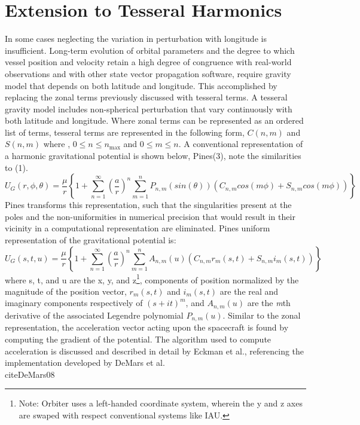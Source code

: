 \documentclass[a4paper]{article}
\begin{document}
\section{Extension to Tesseral Harmonics}
In some cases neglecting the variation in perturbation with longitude is insufficient. Long-term evolution of orbital parameters and the degree to which vessel position and velocity retain a high degree of congruence with real-world observations and with other state vector propagation software, require gravity model that depends on both latitude and longitude.
This accomplished by replacing the zonal terms previously discussed with tesseral terms. A tesseral gravity model includes non-spherical perturbation that vary continuously with both latitude and longitude. Where zonal terms can be represented as an ordered list of terms, tesseral terms are represented in the following form, $C(n,m)$ and $S(n,m)$ where , $0 \leq n \leq n_\text{max}$ and $0 \leq m \leq n$.
A conventional representation of a harmonic gravitational potential is shown below, Pines\cite{pines73}(3), note the similarities to (1).
\begin{equation}
U_G(r,\phi,\theta) = \frac{\mu}{r}\left\{1+\sum_{n=1}^{\infty}\left ( \frac{a}{r} \right )^n \sum_{m=1}^{n}P_{n,m}(sin (\theta))(C_{n,m}cos(m\phi)+S_{n,m}cos(m\phi)) \right\}
\end{equation}
Pines\cite{pines73} transforms this representation, such that the singularities present at the poles and the non-uniformities in numerical precision that would result in their vicinity in a computational representation are eliminated. Pines\cite{pines73} uniform representation of the gravitational potential is:
\begin{equation}
U_G(s, t, u) = \frac{\mu}{r}\left\{1+\sum_{n=1}^{\infty}\left ( \frac{a}{r} \right )^n \sum_{m=1}^{n}A_{n,m}(u)(C_{n,m}r_m(s,t)+S_{n,m}i_m(s,t)) \right\}
\end{equation}
where s, t, and u are the x, y, and z\footnote{Note: Orbiter uses a left-handed coordinate system, wherein the y and z axes are swaped with respect conventional systems like IAU.}, components of position normalized by the magnitude of the position vector, $r_m(s,t)$ and $i_m(s,t)$  are the real and imaginary components respectively of $(s+it)^m$, and $A_{n,m}(u)$ are the \emph{m}th derivative of the associated Legendre polynomial $P_{n,m}(u)$.
Similar to the zonal representation, the acceleration vector acting upon the spacecraft is found by computing the gradient of the potential. The algorithm used to compute acceleration is discussed and described in detail by Eckman et al.\cite{Eckman08}, referencing the implementation developed by DeMars et al.\\cite{DeMars08}
\end{document}
